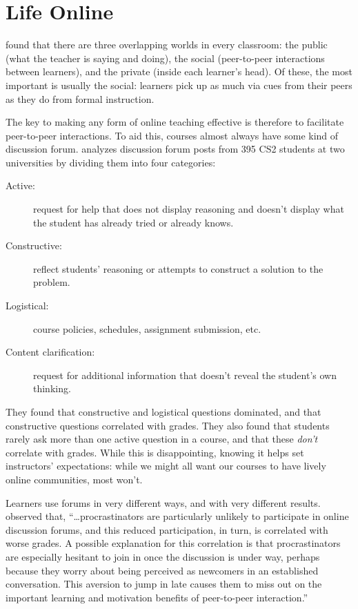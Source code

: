 \section{Life Online}\label{s:online-engagement}

\cite{Nuth2007} found that there are three overlapping worlds in
every classroom: the public (what the teacher is saying and doing), the
social (peer-to-peer interactions between learners), and the private
(inside each learner's head). Of these, the most important is usually
the social: learners pick up as much via cues from their peers as they
do from formal instruction.

The key to making any form of online teaching effective is therefore to
facilitate peer-to-peer interactions. To aid this, courses almost always
have some kind of discussion forum. \cite{Vell2017} analyzes
discussion forum posts from 395 CS2 students at two universities by
dividing them into four categories:

\begin{description}
\item[Active:]
request for help that does not display reasoning and doesn't display
what the student has already tried or already knows.
\item[Constructive:]
reflect students' reasoning or attempts to construct a solution to
the problem.
\item[Logistical:]
course policies, schedules, assignment submission, etc.
\item[Content clarification:]
request for additional information that doesn't reveal the student's
own thinking.
\end{description}

They found that constructive and logistical questions dominated, and
that constructive questions correlated with grades. They also found that
students rarely ask more than one active question in a course, and that
these \emph{don't} correlate with grades. While this is disappointing,
knowing it helps set instructors' expectations: while we might all want
our courses to have lively online communities, most won't.

Learners use forums in very different ways, and with very different
results. \cite{Mill2016a} observed that, ``\ldots{}procrastinators are
particularly unlikely to participate in online discussion forums, and
this reduced participation, in turn, is correlated with worse
grades. A possible explanation for this correlation is that
procrastinators are especially hesitant to join in once the discussion
is under way, perhaps because they worry about being perceived as
newcomers in an established conversation. This aversion to jump in
late causes them to miss out on the important learning and motivation
benefits of peer-to-peer interaction.''

